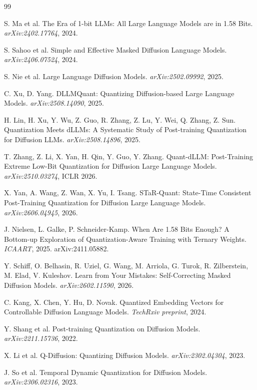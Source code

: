 \documentclass[11pt]{article}
\begin{document}
\begin{thebibliography}{99}\small

 S. Ma et al. The Era of 1-bit LLMs: All Large Language Models are in 1.58 Bits. \emph{arXiv:2402.17764}, 2024.

 S. Sahoo et al. Simple and Effective Masked Diffusion Language Models. \emph{arXiv:2406.07524}, 2024.

 S. Nie et al. Large Language Diffusion Models. \emph{arXiv:2502.09992}, 2025.

 C. Xu, D. Yang. DLLMQuant: Quantizing Diffusion-based Large Language Models. \emph{arXiv:2508.14090}, 2025.

 H. Lin, H. Xu, Y. Wu, Z. Guo, R. Zhang, Z. Lu, Y. Wei, Q. Zhang, Z. Sun. Quantization Meets dLLMs: A Systematic Study of Post-training Quantization for Diffusion LLMs. \emph{arXiv:2508.14896}, 2025.

 T. Zhang, Z. Li, X. Yan, H. Qin, Y. Guo, Y. Zhang. Quant-dLLM: Post-Training Extreme Low-Bit Quantization for Diffusion Large Language Models. \emph{arXiv:2510.03274}, ICLR 2026.

 X. Yan, A. Wang, Z. Wan, X. Yu, I. Tsang. STaR-Quant: State-Time Consistent Post-Training Quantization for Diffusion Large Language Models. \emph{arXiv:2606.04945}, 2026.

 J. Nielsen, L. Galke, P. Schneider-Kamp. When Are 1.58 Bits Enough? A Bottom-up Exploration of Quantization-Aware Training with Ternary Weights. \emph{ICAART}, 2025. arXiv:2411.05882.

 Y. Schiff, O. Belhasin, R. Uziel, G. Wang, M. Arriola, G. Turok, R. Zilberstein, M. Elad, V. Kuleshov. Learn from Your Mistakes: Self-Correcting Masked Diffusion Models. \emph{arXiv:2602.11590}, 2026.

 C. Kang, X. Chen, Y. Hu, D. Novak. Quantized Embedding Vectors for Controllable Diffusion Language Models. \emph{TechRxiv preprint}, 2024.

 Y. Shang et al. Post-training Quantization on Diffusion Models. \emph{arXiv:2211.15736}, 2022.

 X. Li et al. Q-Diffusion: Quantizing Diffusion Models. \emph{arXiv:2302.04304}, 2023.

 J. So et al. Temporal Dynamic Quantization for Diffusion Models. \emph{arXiv:2306.02316}, 2023.


\end{thebibliography}
\end{document}
